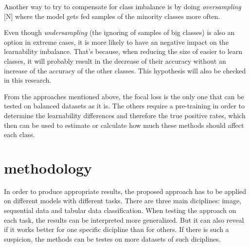 \documentclass[journal]{IEEEtran}
\begin{document}
Another way to try to compensate for class imbalance is by doing \emph{oversampling} [N] where the model gets fed samples of the minority classes more often.

Even though \emph{undersampling} (the ignoring of samples of big classes) is also an option in extreme cases, it is more likely to have an negative impact on the learnability imbalance.
That's because, when reducing the size of easier to learn classes, it will probably result in the decrease of their accuracy without an increase of the accuracy of the other classes.
This hypothesis will also be checked in this research.

From the approaches mentioned above, the focal loss is the only one that can be tested on balanced datasets as it is. 
The others require a pre-training in order to determine the learnability differences and therefore the true positive rates, which then can be used to estimate or calculate how much these methods should affect each class.









\section{methodology}
In order to produce appropriate results, the proposed approach has to be applied on different models with different tasks. 
There are three main diciplines: image, sequential data and tabular data classification. 
When testing the approach on each task, the results can be interpreted more generalized. 
But it can also reveal if it works better for one specific dicipline than for others. 
If there is such a suspicion, the methods can be testes on more datasets of such diciplines.
\end{document}
